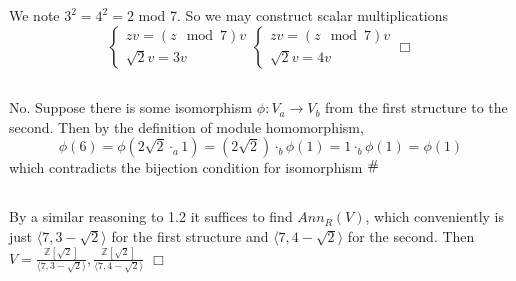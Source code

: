 \documentclass{article}
\newcommand{\contra}{\raisebox{\depth}{\#}}
\begin{document}
\section{}
\subsection{}
We note $3^2 = 4^2 = 2$ mod 7. So we may construct scalar multiplications
\begin{equation*}
\begin{cases}
zv = (z \!\!\!\mod 7)v\\
\sqrt{2}v = 3v
\end{cases}
\begin{cases}
zv = (z \!\!\!\mod 7)v\\
\sqrt{2}v = 4v
\end{cases}
\Box
\end{equation*}

\subsection{}
No. Suppose there is some isomorphism $\phi: V_a \to V_b$ from the first structure to the second. Then by the definition of module homomorphism,
$$\phi(6) = \phi(2\sqrt{2}\cdot_a 1) = (2\sqrt{2}) \cdot_b \phi(1) = 1 \cdot_b \phi(1) = \phi(1)$$
which contradicts the bijection condition for isomorphism $\contra$

\subsection{}
By a similar reasoning to 1.2 it suffices to find $Ann_R(V)$, which conveniently is just $\langle 7, 3 - \sqrt{2} \rangle$ for the first structure and $\langle 7, 4 - \sqrt{2} \rangle$ for the second. Then $V = \frac{\mathbb{Z}[\sqrt{2}]}{\langle 7, 3 - \sqrt{2} \rangle}, \frac{\mathbb{Z}[\sqrt{2}]}{\langle 7, 4 - \sqrt{2} \rangle}$ $\Box$

\section{}
\end{document}
